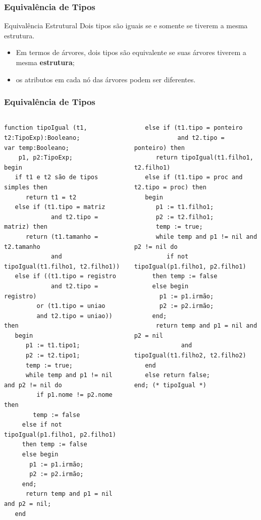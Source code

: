 \documentclass[table]{beamer}
\begin{document}
\begin{frame}
   \frametitle{Equivalência de Tipos}
   \begin{block}{Equivalência Estrutural}
   Dois tipos são iguais se e somente se tiverem a mesma estrutura.
   \begin{itemize}
      \item Em termos de árvores, dois tipos são equivalente se suas árvores tiverem a mesma \textbf{estrutura};
      \item os atributos em cada nó das árvores podem ser diferentes.
   \end{itemize}
   \end{block}
\end{frame}

\begin{frame}[fragile]
   \frametitle{Equivalência de Tipos}
   \tiny
   \begin{columns}
   \begin{column}{0.5\textwidth}
   \begin{verbatim}
function tipoIgual (t1, t2:TipoExp):Booleano;   
var temp:Booleano;
    p1, p2:TipoExp;
begin
   if t1 e t2 são de tipos simples then 
      return t1 = t2
   else if (t1.tipo = matriz 
             and t2.tipo = matriz) then   
      return (t1.tamanho = t2.tamanho 
             and tipoIgual(t1.filho1, t2.filho1))
   else if ((t1.tipo = registro 
             and t2.tipo = registro)
	     or (t1.tipo = uniao 
	     and t2.tipo = uniao)) then
   begin
      p1 := t1.tipo1;
      p2 := t2.tipo1;
      temp := true;
      while temp and p1 != nil and p2 != nil do
         if p1.nome != p2.nome then
	    temp := false
	 else if not tipoIgual(p1.filho1, p2.filho1)
	 then temp := false
	 else begin
	   p1 := p1.irmão;
	   p2 := p2.irmão;
	 end;
      return temp and p1 = nil and p2 = nil;
   end
   \end{verbatim}
   \end{column}
   \begin{column}{0.5\textwidth}
   \begin{verbatim}
   else if (t1.tipo = ponteiro 
            and t2.tipo = ponteiro) then
      return tipoIgual(t1.filho1, t2.filho1)   
   else if (t1.tipo = proc and t2.tipo = proc) then
   begin
      p1 := t1.filho1;
      p2 := t2.filho1;
      temp := true;
      while temp and p1 != nil and p2 != nil do
         if not tipoIgual(p1.filho1, p2.filho1)
	 then temp := false
	 else begin
	   p1 := p1.irmão;
	   p2 := p2.irmão;
	 end;
      return temp and p1 = nil and p2 = nil 
             and tipoIgual(t1.filho2, t2.filho2)
   end
   else return false;
end; (* tipoIgual *)
   \end{verbatim}
   \end{column}
   \end{columns}
\end{frame}
\end{document}
